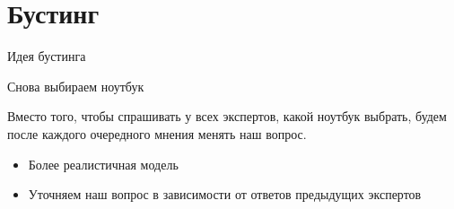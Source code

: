 \documentclass[10pt]{beamer}
\begin{document}
\section{Бустинг}

\begin{frame}{Идея бустинга}
\begin{block}{Снова выбираем ноутбук}
\end{block}
    Вместо того, чтобы спрашивать у всех экспертов, какой ноутбук выбрать,
    будем после каждого очередного мнения менять наш вопрос.
    
\vspace{1em}
\begin{itemize}
    \item Более реалистичная модель
    \item Уточняем наш вопрос в зависимости от ответов предыдущих экспертов
\end{itemize}
\end{frame}
\end{document}
